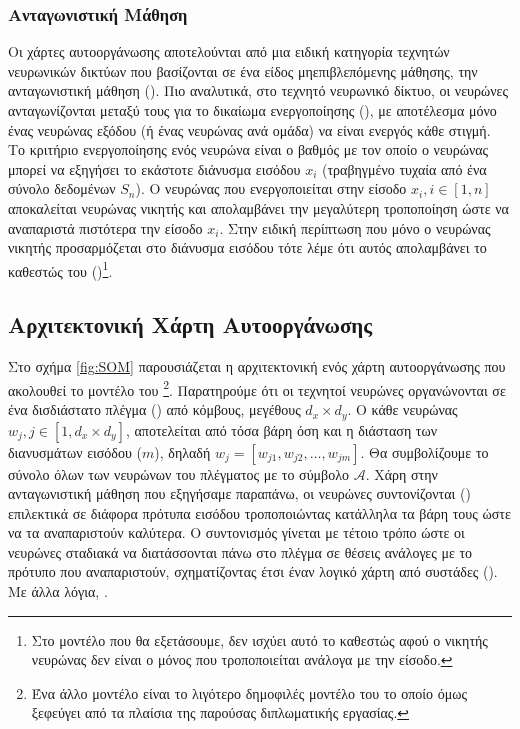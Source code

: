 \subsubsection{Ανταγωνιστική Μάθηση}

Οι χάρτες αυτο\textendash οργάνωσης αποτελούνται από μια ειδική κατηγορία τεχνητών νευρωνικών δικτύων που βασίζονται σε ένα είδος μη\textendash επιβλεπόμενης μάθησης, την ανταγωνιστική μάθηση ()\cite{haykin2009neural}. Πιο αναλυτικά, στο τεχνητό νευρωνικό δίκτυο, οι νευρώνες ανταγωνίζονται μεταξύ τους για το δικαίωμα ενεργοποίησης (), με αποτέλεσμα μόνο ένας νευρώνας εξόδου (ή ένας νευρώνας ανά ομάδα) να είναι ενεργός κάθε στιγμή. Το κριτήριο ενεργοποίησης ενός νευρώνα είναι ο βαθμός με τον οποίο ο νευρώνας μπορεί να εξηγήσει το εκάστοτε διάνυσμα εισόδου $x_i$ (τραβηγμένο τυχαία από ένα σύνολο δεδομένων $S_n$). Ο νευρώνας που ενεργοποιείται στην είσοδο $x_i, i \in [1,n]$ αποκαλείται νευρώνας νικητής και απολαμβάνει την μεγαλύτερη τροποποίηση ώστε να αναπαριστά πιστότερα την είσοδο $x_i$. Στην ειδική περίπτωση που μόνο ο νευρώνας νικητής προσαρμόζεται στο διάνυσμα εισόδου τότε λέμε ότι αυτός απολαμβάνει το καθεστώς του  ()\footnote{Στο μοντέλο που θα εξετάσουμε, δεν ισχύει αυτό το καθεστώς αφού ο νικητής νευρώνας δεν είναι ο μόνος που τροποποιείται ανάλογα με την είσοδο.}. \par

\subsection{Αρχιτεκτονική Χάρτη Αυτο\textendash οργάνωσης}

Στο σχήμα \ref{fig:SOM} παρουσιάζεται η αρχιτεκτονική ενός χάρτη αυτο\textendash οργάνωσης που ακολουθεί το μοντέλο του \footnote{Ένα άλλο μοντέλο είναι το λιγότερο δημοφιλές μοντέλο του  το οποίο όμως ξεφεύγει από τα πλαίσια της παρούσας διπλωματικής εργασίας.}. Παρατηρούμε ότι οι τεχνητοί νευρώνες οργανώνονται σε ένα δισδιάστατο πλέγμα () από κόμβους, μεγέθους $d_x \times d_y$. Ο κάθε νευρώνας $w_j, j \in [1, d_x \times d_y]$, αποτελείται από τόσα βάρη όση και η διάσταση των διανυσμάτων εισόδου ($m$), δηλαδή $w_j = [w_{j1}, w_{j2}, \dots, w_{jm}]$. Θα συμβολίζουμε το σύνολο όλων των νευρώνων του πλέγματος με το σύμβολο $\mathcal{A}$. Χάρη στην ανταγωνιστική μάθηση που εξηγήσαμε παραπάνω, οι νευρώνες συντονίζονται () επιλεκτικά σε διάφορα πρότυπα εισόδου τροποποιώντας κατάλληλα τα βάρη τους ώστε να τα αναπαριστούν καλύτερα. Ο συντονισμός γίνεται με τέτοιο τρόπο ώστε οι νευρώνες σταδιακά να διατάσσονται πάνω στο πλέγμα σε θέσεις ανάλογες με το πρότυπο που αναπαριστούν, σχηματίζοντας έτσι έναν λογικό χάρτη από συστάδες (). Με άλλα λόγια, \cite{haykin2009neural}. \par

